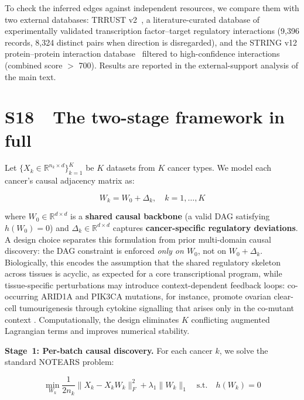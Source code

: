 \documentclass[11pt]{article}
\begin{document}
To check the inferred edges against independent resources, we compare them with two external databases: TRRUST v2~\citep{han2018trrust}, a literature-curated database of experimentally validated transcription factor--target regulatory interactions (9{,}396 records, 8{,}324 distinct pairs when direction is disregarded), and the STRING v12 protein--protein interaction database~\citep{szklarczyk2025string} filtered to high-confidence interactions (combined score $>$ 700). Results are reported in the external-support analysis of the main text.

\section*{S18\ \ The two-stage framework in full}

Let $\{X_k \in \mathbb{R}^{n_k \times d}\}_{k=1}^K$ be $K$ datasets from $K$ cancer types. We model each cancer's causal adjacency matrix as:

\begin{equation}
W_k = W_0 + \Delta_k, \quad k = 1, \ldots, K
\label{eq:decomp}
\end{equation}

where $W_0 \in \mathbb{R}^{d \times d}$ is a \textbf{shared causal backbone} (a valid DAG satisfying $h(W_0) = 0$) and $\Delta_k \in \mathbb{R}^{d \times d}$ captures \textbf{cancer-specific regulatory deviations}. A design choice separates this formulation from prior multi-domain causal discovery: the DAG constraint is enforced \emph{only on $W_0$}, not on $W_0 + \Delta_k$. Biologically, this encodes the assumption that the shared regulatory skeleton across tissues is acyclic, as expected for a core transcriptional program, while tissue-specific perturbations may introduce context-dependent feedback loops: co-occurring ARID1A and PIK3CA mutations, for instance, promote ovarian clear-cell tumourigenesis through cytokine signalling that arises only in the co-mutant context \citep{chandler2015coexistent}. Computationally, the design eliminates $K$ conflicting augmented Lagrangian terms and improves numerical stability.

\textbf{Stage~1: Per-batch causal discovery.} For each cancer $k$, we solve the standard NOTEARS problem:

\begin{equation}
\min_{W_k} \frac{1}{2n_k}\|X_k - X_k W_k\|_F^2 + \lambda_1\|W_k\|_1 \quad \text{s.t.} \quad h(W_k) = 0
\label{eq:stage1}
\end{equation}
\end{document}
